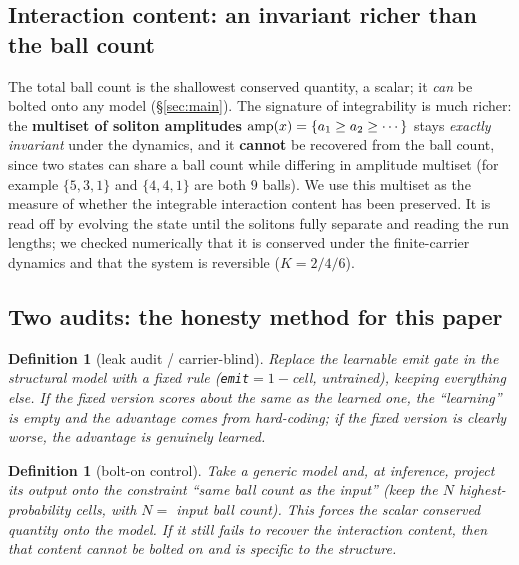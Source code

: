 \documentclass[11pt]{article}
\newtheorem{Definition}[Theorem]{Definition}
\theoremstyle{definition}
\theoremstyle{plain}
\begin{document}
\subsection{Interaction content: an invariant richer than the ball count}\label{sec:setup:content}
The total ball count is the shallowest conserved quantity, a scalar; it \emph{can} be bolted onto
any model (\S\ref{sec:main}). The signature of integrability is much richer: the \textbf{multiset
of soliton amplitudes} $\mathrm{amp}(x)=\{a_1\ge a_2\ge\cdots\}$ stays \emph{exactly invariant} under the
dynamics, and it \textbf{cannot} be recovered from the ball count, since two states can share a
ball count while differing in amplitude multiset (for example $\{5,3,1\}$ and $\{4,4,1\}$ are both
$9$ balls). We use this multiset as the measure of whether the integrable interaction content has
been preserved. It is read off by evolving the state until the solitons fully separate and reading
the run lengths; we checked numerically that it is conserved under the finite-carrier dynamics and
that the system is reversible ($K=2/4/6$).

\subsection{Two audits: the honesty method for this paper}\label{sec:setup:audits}
\begin{Definition}[leak audit / carrier-blind]\label{def:leak}
Replace the \emph{learnable} emit gate in the structural model with a \emph{fixed} rule
(\texttt{emit}$=1-$cell, untrained), keeping everything else. If the fixed version scores about the
same as the learned one, the ``learning'' is empty and the advantage comes from hard-coding; if the
fixed version is clearly worse, the advantage is \emph{genuinely learned}.
\end{Definition}

\begin{Definition}[bolt-on control]\label{def:bolton}
Take a generic model and, at inference, \emph{project} its output onto the constraint ``same ball
count as the input'' (keep the $N$ highest-probability cells, with $N=$ input ball count). This
\emph{forces} the scalar conserved quantity onto the model. If it still fails to recover the
interaction content, then that content \emph{cannot} be bolted on and is specific to the structure.
\end{Definition}

\end{document}
